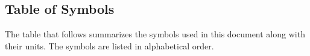 \documentclass[12pt]{article}
\begin{document}





\subsection{Table of Symbols}

The table that follows summarizes the symbols used in this document along with
their units. The symbols are listed in alphabetical order.
\end{document}
